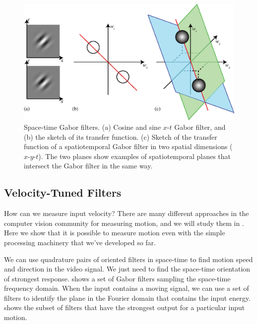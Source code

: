 
\begin{figure}[t]
\centerline{
\includegraphics[width=1\linewidth]{figures/temporal_filters/gabor_spacetime_FT.eps}
}
\caption{Space-time Gabor filters. (a) Cosine and sine $x$-$t$ Gabor filter, and (b) the sketch of its transfer function. (c) Sketch of the transfer function of a spatiotemporal Gabor filter in two spatial dimensions ($x$-$y$-$t$). The two planes show examples of spatiotemporal planes that intersect the Gabor filter in the same way.}
\label{fig:spacetimefilts}
\end{figure}

\subsection{Velocity-Tuned Filters}
\label{sect:velocityTunedFilters}

How can we measure input velocity? There are many different approaches in the computer vision community
for measuring motion, and we will study them in \chap{\ref{chapter:motion_estimation}}.  Here we show that it is possible
to measure motion even with the simple processing machinery that
we've developed so far.



We can use quadrature pairs of oriented filters in space-time to find motion
speed and direction in the video signal.  We just need to find the
space-time orientation of strongest response.  shows a set of Gabor filters sampling the space-time frequency domain. When the input contains a moving signal, we can use a set of filters to identify the plane in the Fourier domain that contains the input energy.  shows the subset of filters that have the strongest output for a particular input motion. 


